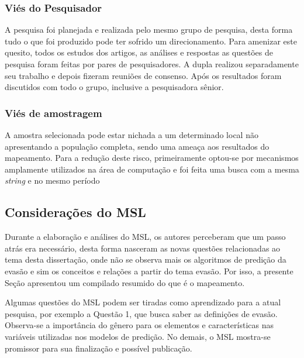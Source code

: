 \subsubsection{Viés do Pesquisador}

A pesquisa foi planejada e realizada pelo mesmo grupo de pesquisa, desta forma tudo o que foi produzido pode ter sofrido um direcionamento. Para amenizar este quesito, todos os estudos dos artigos, as análises e respostas as questões de pesquisa foram feitas por pares de pesquisadores. A dupla realizou separadamente seu trabalho e depois fizeram reuniões de consenso. Após os resultados foram discutidos com todo o grupo, inclusive a pesquisadora sênior.

\subsubsection{Viés de amostragem}

A amostra selecionada pode estar nichada a um determinado local não apresentando a população completa, sendo uma ameaça aos resultados do mapeamento. Para a redução deste risco, primeiramente optou-se por mecanismos amplamente utilizados na área de computação e foi feita uma busca com a mesma \textit{string} e no mesmo período

\subsection{Considerações do MSL}
Durante a elaboração e análises do MSL, os autores perceberam que um passo atrás era necessário, desta forma nasceram as novas questões relacionadas ao tema desta dissertação, onde não se observa mais os algoritmos de predição da evasão e sim os conceitos e relações a partir do tema evasão. Por isso, a presente Seção apresentou um compilado resumido do que é o mapeamento.

Algumas questões do MSL podem ser tiradas como aprendizado para a atual pesquisa, por exemplo a Questão 1, que busca saber as definições de evasão. Observa-se a importância do gênero para os elementos e características nas variáveis utilizadas nos modelos de predição.
No demais, o MSL mostra-se promissor para sua finalização e possível publicação.



